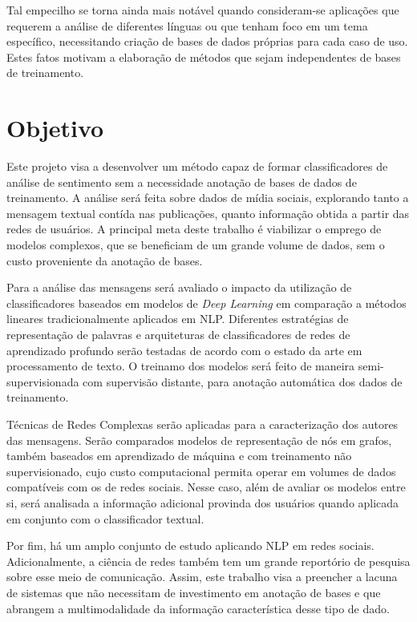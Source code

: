 Tal empecilho se torna ainda mais notável quando consideram-se aplicações que
requerem a análise de diferentes línguas ou que tenham foco em um tema
específico, necessitando criação de bases de dados próprias para cada caso de
uso.
Estes fatos motivam a elaboração de métodos que sejam independentes de bases de
treinamento.

\section{Objetivo}

Este projeto visa a desenvolver um método capaz de formar classificadores de
análise de sentimento sem a necessidade anotação de bases de dados de treinamento.
A análise será feita sobre dados de mídia sociais, explorando tanto a mensagem textual
contída nas publicações, quanto informação obtida a partir das redes de usuários.
A principal meta deste trabalho é viabilizar o emprego de modelos complexos,
que se beneficiam de um grande volume de dados, sem o custo proveniente da anotação
de bases.

Para a análise das mensagens será avaliado o impacto da utilização de
classificadores baseados em modelos de \textit{Deep Learning} em comparação a
métodos lineares tradicionalmente aplicados em NLP.
Diferentes estratégias de representação de palavras e arquiteturas de
classificadores de redes de aprendizado profundo serão testadas de acordo com o
estado da arte em processamento de texto.
O treinamo dos modelos será feito de maneira semi-supervisionada com supervisão distante,
para anotação automática dos dados de treinamento.

Técnicas de Redes Complexas serão aplicadas para a caracterização dos autores das
mensagens.
Serão comparados modelos de representação de nós em grafos, também baseados em
aprendizado de máquina e com treinamento não supervisionado, cujo custo
computacional permita operar em volumes de dados compatíveis com os de redes
sociais.
Nesse caso, além de avaliar os modelos entre si, será analisada a informação
adicional provinda dos usuários quando aplicada em conjunto com o classificador
textual.

Por fim, há um amplo conjunto de estudo aplicando NLP em redes sociais.
Adicionalmente, a ciência de redes também tem um grande reportório de pesquisa
sobre esse meio de comunicação.
Assim, este trabalho visa a preencher a lacuna de sistemas que não necessitam de
investimento em anotação de bases e que abrangem a multimodalidade da
informação característica desse tipo de dado.

